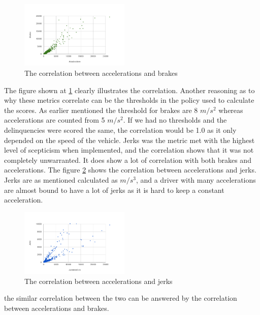 \begin{figure}[tb]
\centering
\includegraphics[width=0.465\textwidth]{Pictures/abcorrel}
\caption{The correlation between accelerations and brakes}
\label{fig:abcorrel}
\end{figure}

The figure shown at \ref{fig:abcorrel} clearly illustrates the correlation. Another reasoning as to why these metrics correlate can be the thresholds in the policy used to calculate the scores. As earlier mentioned the threshold for brakes are 8 $m/s^2$ whereas accelerations are counted from 5 $m/s^2$. If we had no thresholds and the delinquencies were scored the same, the correlation would be 1.0 as it only depended on the speed of the vehicle. 
Jerks was the metric met with the highest level of scepticism when implemented, and the correlation shows that it was not completely unwarranted. It does show a lot of correlation with both brakes and accelerations. The figure \ref{fig:ajcorrel} shows the correlation between accelerations and jerks. Jerks are as mentioned calculated as $m/s^3$, and a driver with many accelerations are almost bound to have a lot of jerks as it is hard to keep a constant acceleration.

\begin{figure}[tb]
\centering
\includegraphics[width=0.465\textwidth]{Pictures/ajcorrel}
\caption{The correlation between accelerations and jerks}
\label{fig:ajcorrel}
\end{figure}


the similar correlation between the two can be answered by the correlation between accelerations and brakes. 

